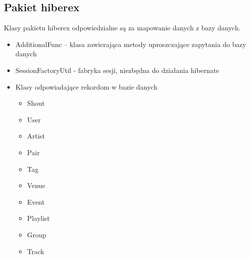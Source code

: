 \documentclass[10pt,a4paper,epic,carom]{article}
\begin{document}
\subsection{Pakiet hiberex}
Klasy pakietu hiberex odpowiedzialne są za mapowanie danych z bazy danych.
\begin{itemize}
\item AdditionalFunc – klasa zawierająca metody uproszczające zapytania do bazy danych
\item SessionFactoryUtil  - fabryka sesji, niezbędna do działania hibernate
\item Klasy odpowiadające rekordom w bazie danych
\begin{itemize}
\item Shout
\item User
\item Artist       
\item Pair 
\item Tag          
\item Venue
\item Event 
\item Playlist 
\item Group   
\item Track
\end{itemize}
\end{itemize}

\begin{thebibliography}{99}   
\end{thebibliography}
\end{document}
